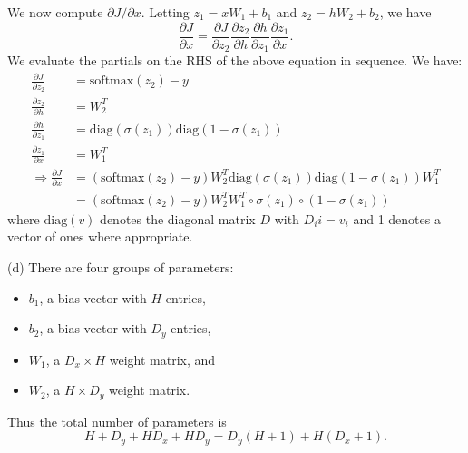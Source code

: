 \documentclass{article}
\begin{document}
We now compute $\partial J/\partial x$. Letting $z_1 = xW_1 + b_1$ and $z_2 = hW_2 + b_2$, we have
$$\frac{\partial J}{\partial x} = \frac{\partial J}{\partial z_2} \frac{\partial z_2}{\partial h} \frac{\partial h}{\partial z_1} \frac{\partial z_1}{\partial x}.$$
We evaluate the partials on the RHS of the above equation in sequence. We have:
\begin{align*}
\frac{\partial J}{\partial z_2} &= \text{softmax}(z_2) - y\\
\frac{\partial z_2}{\partial h} &= W_2^T\\
\frac{\partial h}{\partial z_1} &= \text{diag}(\sigma(z_1))\text{diag}(1 - \sigma(z_1))\\
\frac{\partial z_1}{\partial x} &= W_1^T\\
\Rightarrow \frac{\partial J}{\partial x} &= (\text{softmax}(z_2) - y)W_2^T\text{diag}(\sigma(z_1))\text{diag}(1 - \sigma(z_1))W_1^T\\
&= (\text{softmax}(z_2) - y) W_2^TW_1^T\circ \sigma(z_1) \circ (1 - \sigma(z_1))
\end{align*}
where $\text{diag}(v)$ denotes the diagonal matrix $D$ with $D_ii = v_i$ and 1 denotes a vector of ones where appropriate.

(d) There are four groups of parameters:
\begin{itemize}
\item $b_1$, a bias vector with $H$ entries,
\item $b_2$, a bias vector with $D_y$ entries,
\item $W_1$, a $D_x \times H$ weight matrix, and
\item $W_2$, a $H \times D_y$ weight matrix.
\end{itemize}
Thus the total number of parameters is
$$H + D_y + HD_x + HD_y = D_y(H + 1) + H(D_x + 1).$$
\end{document}

